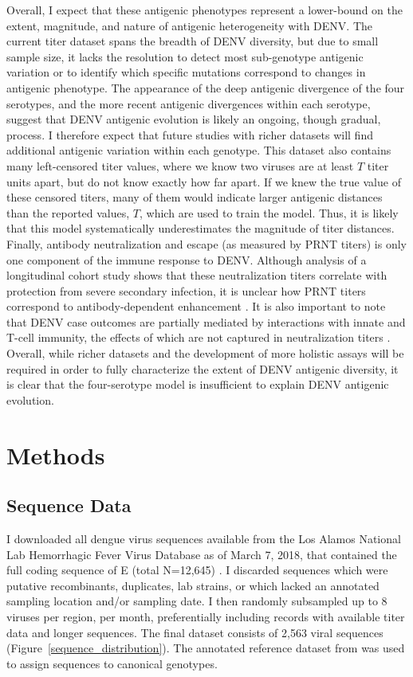Overall, I expect that these antigenic phenotypes represent a lower-bound on the extent, magnitude, and nature of antigenic heterogeneity with DENV.
The current titer dataset spans the breadth of DENV diversity, but due to small sample size, it lacks the resolution to detect most sub-genotype antigenic variation or to identify which specific mutations correspond to changes in antigenic phenotype.
The appearance of the deep antigenic divergence of the four serotypes, and the more recent antigenic divergences within each serotype, suggest that DENV antigenic evolution is likely an ongoing, though gradual, process.
I therefore expect that future studies with richer datasets will find additional antigenic variation within each genotype.
This dataset also contains many left-censored titer values, where we know two viruses are at least $T$ titer units apart, but do not know exactly how far apart.
If we knew the true value of these censored titers, many of them would indicate larger antigenic distances than the reported values, $T$, which are used to train the model.
Thus, it is likely that this model systematically underestimates the magnitude of titer distances.
Finally, antibody neutralization and escape (as measured by PRNT titers) is only one component of the immune response to DENV.
Although analysis of a longitudinal cohort study shows that these neutralization titers correlate with protection from severe secondary infection, it is unclear how PRNT titers correspond to antibody-dependent enhancement \citep{katzelnick2016neutralizing}.
It is also important to note that DENV case outcomes are partially mediated by interactions with innate and T-cell immunity, the effects of which are not captured in neutralization titers \citep{green2014innate}.
Overall, while richer datasets and the development of more holistic assays will be required in order to fully characterize the extent of DENV antigenic diversity, it is clear that the four-serotype model is insufficient to explain DENV antigenic evolution.
\clearpage
\section{Methods}
\subsection*{Sequence Data}
I downloaded all dengue virus sequences available from the Los Alamos National Lab Hemorrhagic Fever Virus Database as of March 7, 2018, that contained the full coding sequence of E (total N=12,645) \citep{kuiken2011lanl}.
I discarded sequences which were putative recombinants, duplicates, lab strains, or which lacked an annotated sampling location and/or sampling date.
I then randomly subsampled up to 8 viruses per region, per month, preferentially including records with available titer data and longer sequences.
The final dataset consists of 2,563 viral sequences (Figure~\ref{sequence_distribution}).
The annotated reference dataset from \citep{pyke2016highly} was used to assign sequences to canonical genotypes.

